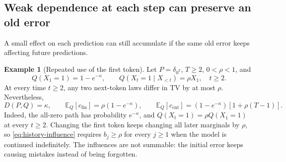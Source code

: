 \documentclass[11pt,twoside]{article}
\newcommand{\E}{\mathbb E}
\newcommand{\KL}{D}
\theoremstyle{definition}
\newtheorem{example}[theorem]{Example}
\theoremstyle{remark}
\begin{document}
\subsection{Weak dependence at each step can preserve an old error}

A small effect on each prediction can still accumulate if the same
old error keeps affecting future predictions.
\begin{example}[Repeated use of the first token]
\label{ex:unchanging-influence}
Let \(P=\delta_{0^T}\), \(T\ge2\), \(0<\rho<1\), and
\[
 Q(X_1=1)=1-e^{-\kappa},\qquad
 Q(X_t=1\mid X_{<t})=\rho X_1,\quad t\ge2.
\]
At every time \(t\ge2\), any two next-token laws differ in TV by at
most \(\rho\). Nevertheless,
\[
 \KL(P,Q)=\kappa,\qquad
 \E_Q[c_{\mathrm{fin}}]=\rho(1-e^{-\kappa}),\qquad
 \E_Q[c_{\mathrm{cnt}}]=(1-e^{-\kappa})[1+\rho(T-1)].
\]
Indeed, the all-zero path has probability \(e^{-\kappa}\), and
\(Q(X_t=1)=\rho Q(X_1=1)\) at every \(t\ge2\).
Changing the first token keeps changing all later marginals by
\(\rho\), so \cref{eq:history-influence} requires \(b_j\ge\rho\)
for every \(j\ge1\) when the model is continued indefinitely.
The influences are not summable: the initial error keeps causing
mistakes instead of being forgotten.
\end{example}
\end{document}
